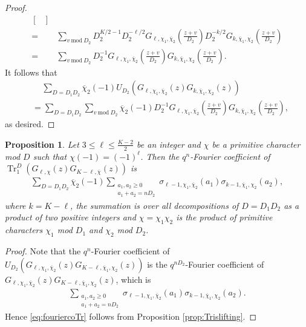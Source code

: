 \documentclass[11pt,letterpaper,reqno]{amsart}
\newcommand\ques[1]{\textcolor{blue}{\textbf{Question}: #1}}
\numberwithin{figure}{section}
\numberwithin{table}{section}
\theoremstyle{definition}
\theoremstyle{plain}
\newtheorem{proposition}[theorem]{Proposition}
\theoremstyle{definition}
\theoremstyle{definition}
\theoremstyle{remark}
\numberwithin{equation}{section}
\theoremstyle{remark}
\DeclareMathOperator{\Tr}{Tr}
\begin{document}
\begin{proof}
\begin{align*}
\begin{bmatrix}
        \end{bmatrix}\\=&\sum_{v~\text{mod}~D_2}D_2^{K/2-1}D_2^{-\ell/2}G_{\ell,\chi_1,\overline{\chi}_{2}}\left(\frac{z+v}{D_2}\right) D_2^{-k/2}G_{k,\overline{\chi}_{1},\chi_2}\left(\frac{z+v}{D_2}\right)\\=&\sum_{v~\text{mod}~D_2}D_2^{-1}G_{\ell,\chi_1,\overline{\chi}_{2}}\left(\frac{z+v}{D_2}\right)G_{k,\overline{\chi}_{1},\chi_2}\left(\frac{z+v}{D_2}\right).
    \end{align*}
    It follows that 
    \begin{align*}
       &\quad \,\sum_{D=D_1D_2}\overline{\chi}_2(-1)U_{D_2}\left(G_{\ell,\chi_1,\overline{\chi}_{2}}(z)G_{k,\overline{\chi}_{1},\chi_2}(z)\right)\\&=\sum_{D=D_1D_2}\sum_{v~\text{mod}~D_2}\overline{\chi}_2(-1)D_2^{-1}G_{\ell,\chi_1,\overline{\chi}_{2}}\left(\frac{z+v}{D_2}\right)G_{k,\overline{\chi}_{1},\chi_2}\left(\frac{z+v}{D_2}\right),
    \end{align*}
    as desired.
\end{proof}
\begin{proposition}\label{prop:Fourco}
   Let $3\leq \ell\leq\frac{K-2}{2}$ be an integer 
   and  $\chi$ be a primitive character mod $D$ such that $\chi(-1)=(-1)^{\ell}$. Then the $q^n$-Fourier coefficient of $\Tr^D_1(G_{\ell,\chi}(z)G_{K-\ell,\overline{\chi}}(z)) $ is 
    \begin{align}
\sum_{D=D_1D_2}\overline{\chi}_2(-1)\sum_{\substack{a_1,a_2\geq0\\a_1+a_2=nD_2}}\sigma_{\ell-1,\chi_1,\overline{\chi}_{2}}(a_1)\sigma_{k-1,\overline{\chi}_{1},\chi_2}(a_2),\label{eq:fouriercoTr}
    \end{align}
    where $k=K-\ell$,  the summation is over all decompositions of $D=D_1D_2$ as a product of two positive integers and $\chi=\chi_1\chi_2$ is the product of primitive characters $\chi_1$ mod $D_1$ and $\chi_2$ mod $D_2$.
\end{proposition}
\begin{proof}
Note that the $q^n$-Fourier coefficient of $U_{D_2}\left(G_{\ell,\chi_1,\overline{\chi}_{2}}(z)G_{K-\ell,\overline{\chi}_{1},\chi_2}(z)\right)$ is the $q^{nD_2}$-Fourier coefficient of $G_{\ell,\chi_1,\overline{\chi}_{2}}(z)G_{K-\ell,\overline{\chi}_{1},\chi_2}(z)$, which is 
    \begin{align*}
\sum_{\substack{a_1,a_2\geq0\\a_1+a_2=nD_2}}\sigma_{\ell-1,\chi_1,\overline{\chi}_{2}}(a_1)\sigma_{k-1,\overline{\chi}_{1},\chi_2}(a_2).
    \end{align*}
Hence \eqref{eq:fouriercoTr} follows from Proposition \ref{prop:Trislifting}.
\end{proof}
\end{document}
